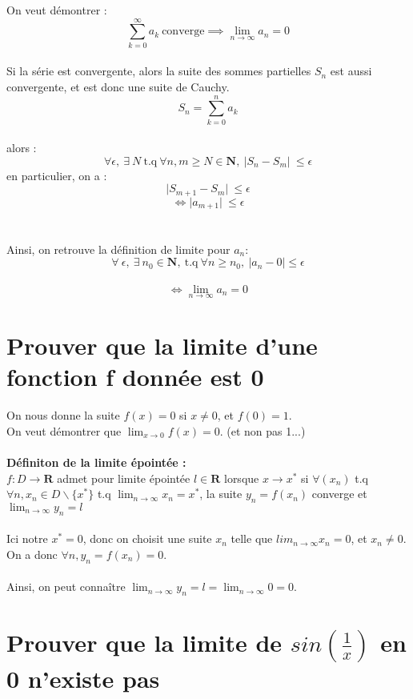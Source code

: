 \documentclass{article}
\begin{document}
On veut démontrer :
\[ \sum_{k=0}^{\infty} a_k\ \text{converge} \implies \lim_{n\to\infty} a_n = 0 \]\\
Si la série est convergente, alors la suite des sommes partielles $ S_n $ est aussi convergente, et est donc une suite de Cauchy.
\[ S_n = \sum_{k=0}^{n} a_k \]\\
alors :
\[ \forall \epsilon,\ \exists\ N\ \text{t.q}\ \forall n, m \geq N \in \mathbf{N},\ \lvert S_n - S_m \lvert\ \leq \epsilon \]
en particulier, on a :
\[ \lvert S_{m+1} - S_m \lvert\ \leq \epsilon \]
\[ \Leftrightarrow \lvert a_{m+1} \lvert\ \leq \epsilon \]\\\\
Ainsi, on retrouve la définition de limite pour $ a_n $:\\
\[ \forall\ \epsilon,\ \exists\ n_0 \in \mathbf{N},\ \text{t.q}\ \forall n \geq n_0,\ |a_n - 0| \leq \epsilon \]\\
\[ \Leftrightarrow \lim_{n\to\infty} a_n = 0 \]

\newpage

\section{Prouver que la limite d'une fonction f donnée est 0}

On nous donne la suite $ f(x) = 0 $ si $ x \neq 0 $, et $ f(0) = 1 $.\\
On veut démontrer que $ \lim_{x\to{0}} f(x) = 0 $. (et non pas 1...)\\\\
\textbf{Définiton de la limite épointée :}\\
$ f : D \to \mathbf{R} $ admet pour limite épointée $ l \in \mathbf{R} $ lorsque $ x \to x^* $ si $ \forall (x_n) $ t.q $ \forall n, x_n \in D \backslash \{x^*\} $ t.q $ \lim_{n\to\infty} x_n = x^*$, la suite $ y_n = f(x_n) $ converge et $ \lim_{n\to\infty} y_n = l$\\\\
Ici notre $ x^* = 0 $, donc on choisit une suite $ x_n $ telle que $ lim_{n\to\infty} x_n = 0$, et $ x_n \neq 0$. On a donc $ \forall n, y_n = f(x_n) = 0 $.\\\\
Ainsi, on peut connaître $ \lim_{n\to\infty} y_n = l = \lim_{n\to\infty} 0 = 0$.

\newpage
\section{Prouver que la limite de $ sin(\frac{1}{x}) $ en 0 n'existe pas}
\end{document}
